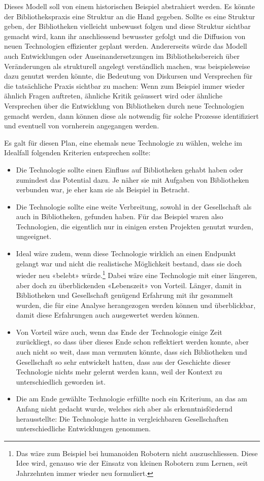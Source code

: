 \documentclass[a4paper,
fontsize=11pt,
oneside,
numbers=noperiodatend,
parskip=half-,
bibliography=totoc,
final
]{scrartcl}
\begin{document}
Dieses Modell soll von einem historischen Beispiel abstrahiert werden.
Es könnte der Bibliothekspraxis eine Struktur an die Hand gegeben.
Sollte es eine Struktur geben, der Bibliotheken vielleicht unbewusst
folgen und diese Struktur sichtbar gemacht wird, kann ihr anschliessend
bewusster gefolgt und die Diffusion von neuen Technologien effizienter
geplant werden. Andererseits würde das Modell auch Entwicklungen oder
Auseinandersetzungen im Bibliotheksbereich über Veränderungen als
strukturell angelegt verständlich machen, was beispielsweise dazu
genutzt werden könnte, die Bedeutung von Diskursen und Versprechen für
die tatsächliche Praxis sichtbar zu machen: Wenn zum Beispiel immer
wieder ähnlich Fragen auftreten, ähnliche Kritik geäussert wird oder
ähnliche Versprechen über die Entwicklung von Bibliotheken durch neue
Technologien gemacht werden, dann können diese als notwendig für solche
Prozesse identifiziert und eventuell von vornherein angegangen werden.

Es galt für diesen Plan, eine ehemals neue Technologie zu wählen, welche
im Idealfall folgenden Kriterien entsprechen sollte:

\begin{itemize}
\item
  Die Technologie sollte einen Einfluss auf Bibliotheken gehabt haben
  oder zumindest das Potential dazu. Je näher sie mit Aufgaben von
  Bibliotheken verbunden war, je eher kam sie als Beispiel in Betracht.
\item
  Die Technologie sollte eine weite Verbreitung, sowohl in der
  Gesellschaft als auch in Bibliotheken, gefunden haben. Für das
  Beispiel waren also Technologien, die eigentlich nur in einigen ersten
  Projekten genutzt wurden, ungeeignet.
\item
  Ideal wäre zudem, wenn diese Technologie wirklich an einen Endpunkt
  gelangt war und nicht die realistische Möglichkeit bestand, dass sie
  doch wieder neu «belebt» würde.\footnote{Das wäre zum Beispiel bei
    humanoiden Robotern nicht auszuschliessen. Diese Idee wird, genauso
    wie der Einsatz von kleinen Robotern zum Lernen, seit Jahrzehnten
    immer wieder neu formuliert.} Dabei wäre eine Technologie mit einer
  längeren, aber doch zu überblickenden «Lebenszeit» von Vorteil.
  Länger, damit in Bibliotheken und Gesellschaft genügend Erfahrung mit
  ihr gesammelt wurden, die für eine Analyse herangezogen werden können
  und überblickbar, damit diese Erfahrungen auch ausgewertet werden
  können.
\item
  Von Vorteil wäre auch, wenn das Ende der Technologie einige Zeit
  zurückliegt, so dass über dieses Ende schon reflektiert werden konnte,
  aber auch nicht so weit, dass man vermuten könnte, dass sich
  Bibliotheken und Gesellschaft so sehr entwickelt hatten, dass aus der
  Geschichte dieser Technologie nichts mehr gelernt werden kann, weil
  der Kontext zu unterschiedlich geworden ist.
\item
  Die am Ende gewählte Technologie erfüllte noch ein Kriterium, an das
  am Anfang nicht gedacht wurde, welches sich aber als
  erkenntnisfördernd herausstellte: Die Technologie hatte in
  vergleichbaren Gesellschaften unterschiedliche Entwicklungen genommen.
\end{itemize}
\end{document}
